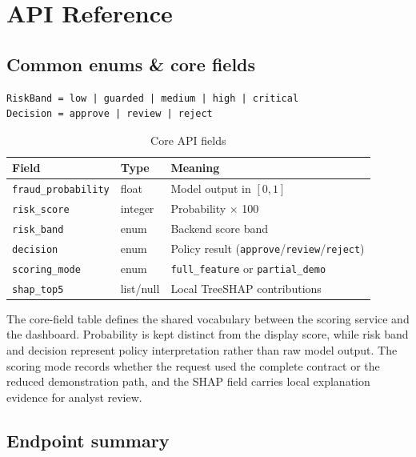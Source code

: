 \chapter{API Reference}
\label{app:api}

\section{Common enums \& core fields}

\begin{lstlisting}
RiskBand = low | guarded | medium | high | critical
Decision = approve | review | reject
\end{lstlisting}

\begingroup
\small
\begin{table}[H]
\centering
\caption{Core API fields}
\label{tab:core-api-fields}
\begin{tabularx}{\textwidth}{p{}p{}X}
\toprule
\textbf{Field} & \textbf{Type} & \textbf{Meaning}\\
\midrule
\texttt{fraud\_probability} & float & Model output in \([0,1]\)\\
\texttt{risk\_score} & integer & Probability $\times$ 100\\
\texttt{risk\_band} & enum & Backend score band\\
\texttt{decision} & enum & Policy result (\texttt{approve}/\texttt{review}/\texttt{reject})\\
\texttt{scoring\_mode} & enum & \texttt{full\_feature} or \texttt{partial\_demo}\\
\texttt{shap\_top5} & list/null & Local TreeSHAP contributions\\
\bottomrule
\end{tabularx}
\end{table}
\endgroup

The core-field table defines the shared vocabulary between the scoring service
and the dashboard. Probability is kept distinct from the display score, while
risk band and decision represent policy interpretation rather than raw model
output. The scoring mode records whether the request used the complete contract
or the reduced demonstration path, and the SHAP field carries local explanation
evidence for analyst review.

\section{Endpoint summary}

